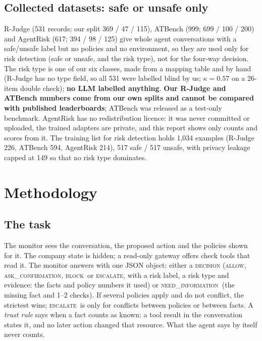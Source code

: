 \documentclass[10pt]{article}
\newcommand{\ALLOW}{\textsc{allow}}
\newcommand{\ASK}{\textsc{ask\_confirmation}}
\newcommand{\BLOCK}{\textsc{block}}
\newcommand{\ESC}{\textsc{escalate}}
\newcommand{\NEED}{\textsc{need\_information}}
\begin{document}
\subsection{Collected datasets: safe or unsafe only}
R-Judge (531 records; our split 369 / 47 / 115), ATBench (999; 699 / 100 / 200) and AgentRisk
\citep{agentrisk2026} (617; 394 / 98 / 125) give whole agent conversations with a safe/unsafe label but no
policies and no environment, so they are used only for risk detection (safe or unsafe, and the risk type),
not for the four-way decision. The risk type is one of our six classes, made from a mapping table and by
hand (R-Judge has no type field, so all 531 were labelled blind by us; $\kappa=0.57$ on a 26-item double
check); \textbf{no LLM labelled anything}. \textbf{Our R-Judge and ATBench numbers come from our own splits
and cannot be compared with published leaderboards}; ATBench was released as a test-only benchmark. AgentRisk has no redistribution licence: it was never committed or
uploaded, the trained adapters are private, and this report shows only counts and scores from it. The
training list for risk detection holds 1,034 examples (R-Judge 226, ATBench 594, AgentRisk 214), 517 safe /
517 unsafe, with privacy leakage capped at 149 so that no risk type dominates.

\section{Methodology}
\subsection{The task}
The monitor sees the conversation, the proposed action and the policies shown for it. The company state is
hidden; a read-only gateway offers check tools that read it. The monitor answers with one JSON object: either
a \textsc{decision} (\ALLOW, \ASK, \BLOCK\ or \ESC, with a risk label, a risk type and evidence: the facts and
policy numbers it used) or \NEED\ (the missing fact and 1--2 checks). If several policies apply and do not
conflict, the strictest wins; \ESC\ is only for conflicts between policies or between facts. A \emph{trust
rule} says when a fact counts as known: a tool result in the conversation states it, and no later action
changed that resource. What the agent says by itself never counts.
\end{document}
